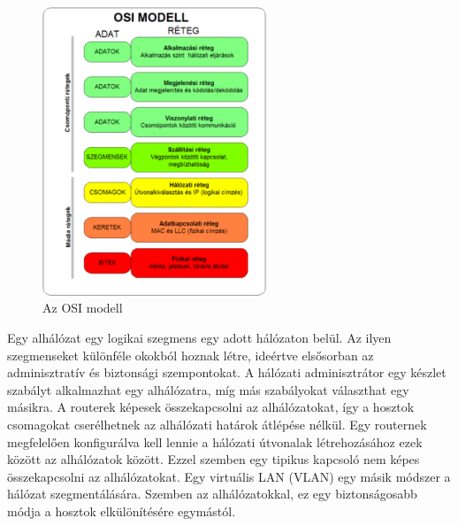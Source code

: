 \begin{figure}[H]
	\centering
	\includegraphics[width=67mm, keepaspectratio]{figures/osi_modell.png}
	\caption{Az OSI modell}
	\label {fig:osi_modell}
\end{figure}

Egy alhálózat egy logikai szegmens egy adott hálózaton belül. Az ilyen szegmenseket
különféle okokból hoznak létre, ideértve elsősorban az adminisztratív és biztonsági
szempontokat. A hálózati adminisztrátor egy készlet szabályt alkalmazhat egy
alhálózatra, míg más szabályokat választhat egy másikra. A routerek képesek
összekapcsolni az alhálózatokat, így a hosztok csomagokat cserélhetnek az
alhálózati határok átlépése nélkül. Egy routernek megfelelően konfigurálva kell
lennie a hálózati útvonalak létrehozásához ezek között az alhálózatok között.
Ezzel szemben egy tipikus kapcsoló nem képes összekapcsolni az alhálózatokat.
Egy virtuális LAN (VLAN) egy másik módszer a hálózat szegmentálására. 
Szemben az alhálózatokkal, ez egy biztonságosabb módja a hosztok elkülönítésére egymástól.

